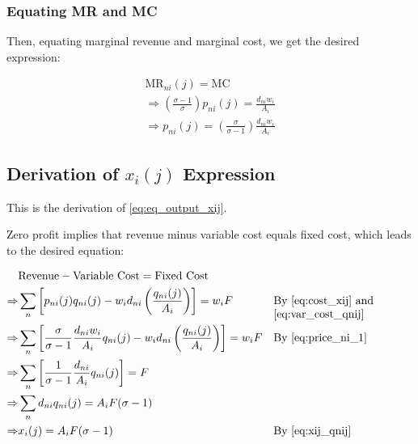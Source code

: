 \documentclass[10pt]{article}
\begin{document}

\subsubsection{Equating MR and MC}

Then, equating marginal revenue and marginal cost, we get
the desired expression:

\begin{align}
    \text{MR}_{n i}(j) = \text{MC} \\
    \Rightarrow \left(\frac{\sigma - 1}{\sigma}\right) p_{n i}(j) = \frac{d_{ni} w_i}{A_i} \\
    \Rightarrow p_{n i}(j) = \left(\frac{\sigma}{\sigma-1}\right) \frac{d_{ni} w_i}{A_i}
\end{align}


\subsection{Derivation of $x_i(j)$ Expression}
\label{sec:eq_output_xij}

This is the derivation of \eqref{eq:eq_output_xij}.

Zero profit implies that 
revenue minus variable cost equals fixed cost,
which leads to the desired equation:

\begin{align}
    &\text{Revenue} - \text{Variable Cost} = \text{Fixed Cost} \\
    \Rightarrow & \sum_n \left[p_{ni}(j) q_{ni}(j) - w_i d_{ni} \left(\frac{q_{ni}(j)}{A_i}\right)\right] = w_i F && \parbox[t]{4cm}{\raggedright By \eqref{eq:cost_xij} and \eqref{eq:var_cost_qnij}} \\
    \Rightarrow & \sum_n \left[\frac{\sigma}{\sigma-1} \frac{d_{ni} w_i}{A_i} q_{ni}(j) - w_i d_{ni} \left(\frac{q_{ni}(j)}{A_i}\right)\right] = w_i F && \parbox[t]{4cm}{\raggedright By \eqref{eq:price_ni_1}} \\
    \Rightarrow & \sum_n \left[\frac{1}{\sigma-1} \frac{d_{ni}}{A_i} q_{ni}(j)\right] = F \\ 
    \Rightarrow & \sum_n d_{ni} q_{ni}(j) = A_i F (\sigma-1) \\
    \Rightarrow & x_i(j) = A_i F (\sigma-1) && \parbox[t]{4cm}{\raggedright By \eqref{eq:xij_qnij}}
\end{align}
\end{document}

